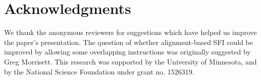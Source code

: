 \documentclass[conference]{IEEEtran}
\begin{document}


\section*{Acknowledgments}

We thank the anonymous reviewers for suggestions which have helped us
improve the paper's presentation.
%
The question of whether alignment-based SFI could be improved by
allowing some overlapping instructions was originally suggested by
Greg Morrisett.
%
This research was supported by the University of Minnesota, and by the
National Science Foundation under grant no. 1526319.





%











\label{app:coq-details}
\end{document}
